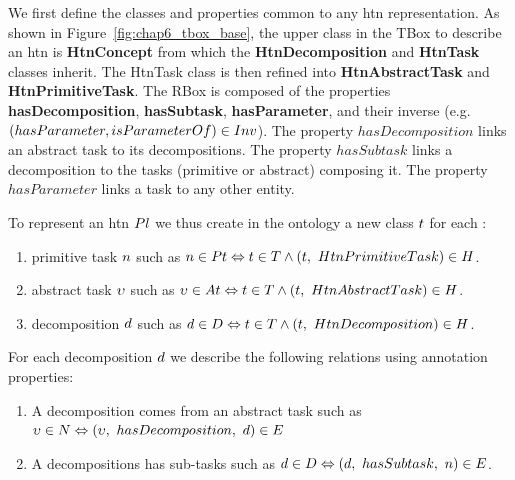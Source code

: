 We first define the classes and properties common to any \acrshort{htn} representation. As shown in Figure~\ref{fig:chap6_tbox_base}, the upper class in the TBox to describe an \acrshort{htn} is \textbf{HtnConcept} from which the \textbf{HtnDecomposition} and \textbf{HtnTask} classes inherit. The HtnTask class is then refined into \textbf{HtnAbstractTask} and \textbf{HtnPrimitiveTask}.
The RBox is composed of the properties \textbf{hasDecomposition}, \textbf{hasSubtask}, \textbf{hasParameter}, and their inverse (e.g. $(hasParameter, isParameterOf) \in Inv$). The property $hasDecomposition$ links an abstract task to its decompositions. The property $hasSubtask$ links a decomposition to the tasks (primitive or abstract) composing it. The property $hasParameter$ links a task to any other entity.

To represent an \acrshort{htn} $Pl$ we thus create in the ontology a new class $t$ for each :
\begin{enumerate}
	\item primitive task $n$ such as 
$n \in Pt \Leftrightarrow t \in T \wedge (t,\ HtnPrimitiveTask) \in H$.
	\item abstract task $\upsilon$ such as $\upsilon \in At \Leftrightarrow t \in T \wedge (t,\ HtnAbstractTask) \in H$.
	\item decomposition $d$ such as $d \in D \Leftrightarrow t \in T \wedge (t,\ HtnDecomposition) \in H$.
\end{enumerate}

For each decomposition $d$ we describe the following relations using annotation properties:
\begin{enumerate}
	\item A decomposition comes from an abstract task such as $\upsilon \in N \Leftrightarrow (\upsilon,\ hasDecomposition,\ d) \in E$
	\item A decompositions has sub-tasks such as $d \in D \Leftrightarrow (d,\ hasSubtask,\ n) \in E$.
\end{enumerate}

